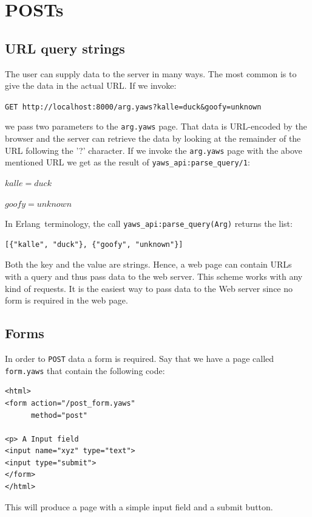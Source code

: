 \documentclass[11pt,oneside,english]{book}
\newcommand{\Erlang}            %
        {{\sc Erlang}}
\begin{document}
\section{POSTs}

\subsection{URL query strings}

The user can supply data to the server in many ways. The most
common is to give the data in the actual URL.
If we invoke:

\verb+GET http://localhost:8000/arg.yaws?kalle=duck&goofy=unknown+

we pass two parameters to the \verb+arg.yaws+ page.  That data is
URL-encoded by the browser and the server can retrieve the data by
looking at the remainder of the URL following the '?' character.  If
we invoke the \verb+arg.yaws+ page with the above mentioned URL we get
as the result of \verb+yaws_api:parse_query/1+:

$kalle = duck$

$goofy = unknown$

In \Erlang\  terminology, the call \verb+yaws_api:parse_query(Arg)+ returns
the list:
\begin{verbatim}
[{"kalle", "duck"}, {"goofy", "unknown"}]
\end{verbatim}

Both the key and the value are strings. Hence, a web page can contain URLs with
a query and thus pass data to the web server. This scheme works with any kind of
requests. It is the easiest way to pass data to the Web server since no form is
required in the web page.


\subsection{Forms}

In order to \verb+POST+ data a form is required. Say that we have a
page called \verb+form.yaws+ that contain the following code:

\begin{verbatim}
<html>
<form action="/post_form.yaws"
      method="post"

<p> A Input field
<input name="xyz" type="text">
<input type="submit">
</form>
</html>
\end{verbatim}

This will produce a page with a simple input field and a submit button.
\end{document}
